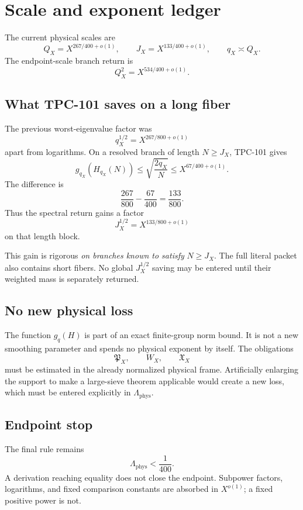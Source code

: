\section{Scale and exponent ledger}
\label{sec:exponent-ledger}

The current physical scales are
\[
 Q_X=X^{267/400+o(1)},\qquad
 J_X=X^{133/400+o(1)},\qquad
 q_X\asymp Q_X.
\]
The endpoint-scale branch return is
\[
 Q_X^2=X^{534/400+o(1)}.
\]

\subsection{What TPC-101 saves on a long fiber}

The previous worst-eigenvalue factor was
\[
 q_X^{1/2}
 =
 X^{267/800+o(1)}
\]
apart from logarithms.  On a resolved branch of length
\(N\ge J_X\), TPC-101 gives
\[
 g_{q_X}(H_{q_X}(N))
 \le
 \sqrt{\frac{2q_X}{N}}
 \le
 X^{67/400+o(1)}.
\]
The difference is
\[
 \frac{267}{800}-\frac{67}{400}
 =
 \frac{133}{800}.
\]
Thus the spectral return gains a factor
\[
 J_X^{1/2}=X^{133/800+o(1)}
\]
on that length block.

\begin{remark}
This gain is rigorous \emph{on branches known to satisfy}
\(N\ge J_X\).  The full literal packet also contains short fibers.
No global \(J_X^{1/2}\) saving may be entered until their weighted
mass is separately returned.
\end{remark}

\subsection{No new physical loss}

The function \(g_q(H)\) is part of an exact finite-group norm bound.
It is not a new smoothing parameter and spends no physical exponent
by itself.  The obligations
\[
 \mathfrak P_X,\qquad W_X,\qquad\mathfrak X_X
\]
must be estimated in the already normalized physical frame.
Artificially enlarging the support to make a large-sieve theorem
applicable would create a new loss, which must be entered explicitly
in \(\Lambda_{\mathrm{phys}}\).

\subsection{Endpoint stop}

The final rule remains
\[
 \Lambda_{\mathrm{phys}}<\frac1{400}.
\]
A derivation reaching equality does not close the endpoint.
Subpower factors, logarithms, and fixed comparison constants are
absorbed in \(X^{o(1)}\); a fixed positive power is not.

